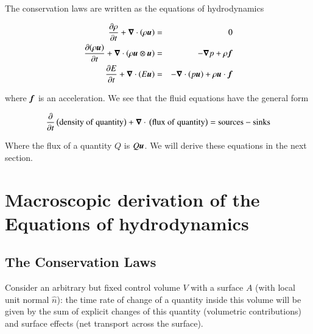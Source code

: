 The conservation laws are written as the equations of hydrodynamics 

\begin{eqnarray}
  \frac{\partial{\rho}}{\partial{t}} + {\boldsymbol{\nabla}}\cdot{\left(\rho {\boldsymbol{u}}\right)} &=& 0 \\
\frac{\partial{\left(\rho {\boldsymbol{u}}\right)}}{\partial{t}} + {\boldsymbol{\nabla}}\cdot{\left(\rho {\boldsymbol{u}}\otimes{\boldsymbol{u}}\right)} &=& -{\boldsymbol{\nabla}}{p} + \rho{\boldsymbol{f}}\\
\frac{\partial{E}}{\partial{t}} + {\boldsymbol{\nabla}}\cdot{\left(E{\boldsymbol{u}}\right)} &=& -{\boldsymbol{\nabla}}\cdot{\left(p{\boldsymbol{u}}\right)} + \rho{\boldsymbol{u}}\cdot{\boldsymbol{f}}
  \end{eqnarray}

\noindent   where ${\boldsymbol{f}}$ is an acceleration. We see that the fluid equations have the general form

\begin{equation}
  \ptderiv{}\left(\mathrm{density \ of \ quantity}\right) +  \Div{}\left(\mathrm{flux \ of \ quantity}\right) = \mathrm{sources} - \mathrm{sinks}  
\end{equation}

Where the flux of a quantity $Q$ is $Q{\boldsymbol{u}}$. We will derive these equations in the next section. 

\section{Macroscopic derivation of the Equations of hydrodynamics}


\subsection{The Conservation Laws}

Consider an arbitrary but fixed control volume $V$
 with a surface $A$ (with local unit normal $\hat{n}$): the
time rate of change of a quantity inside this volume will be given by the sum of explicit
changes of this quantity (volumetric contributions) and surface eﬀects (net transport
across the surface).


